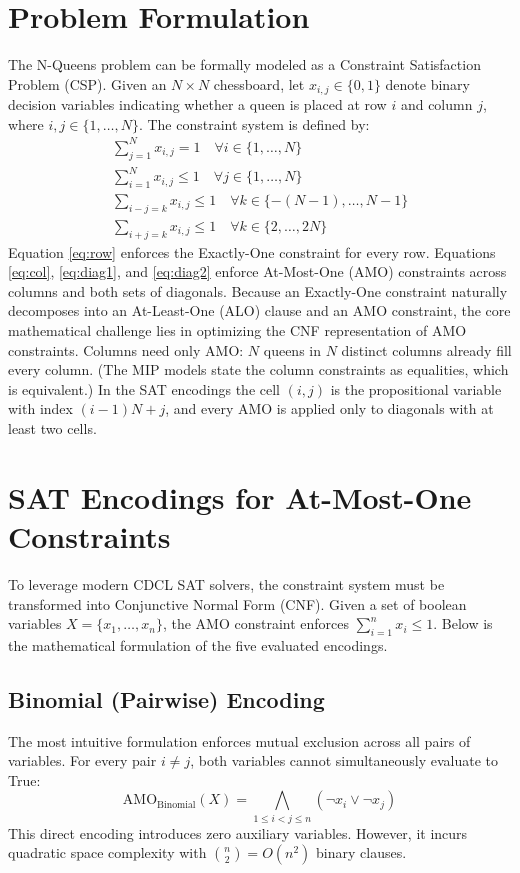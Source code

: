 \documentclass[a4paper,fleqn]{cas-sc}
\begin{document}
\section{Problem Formulation}
The N-Queens problem can be formally modeled as a Constraint Satisfaction Problem (CSP). Given an $N \times N$ chessboard, let $x_{i,j} \in \{0, 1\}$ denote binary decision variables indicating whether a queen is placed at row $i$ and column $j$, where $i, j \in \{1, \dots, N\}$. The constraint system is defined by:
\begin{align}
    \sum_{j=1}^{N} x_{i,j} = 1 \quad \forall i \in \{1, \dots, N\} \label{eq:row} \\
    \sum_{i=1}^{N} x_{i,j} \leq 1 \quad \forall j \in \{1, \dots, N\} \label{eq:col} \\
    \sum_{i-j=k} x_{i,j} \leq 1 \quad \forall k \in \{-(N-1), \dots, N-1\} \label{eq:diag1} \\
    \sum_{i+j=k} x_{i,j} \leq 1 \quad \forall k \in \{2, \dots, 2N\} \label{eq:diag2}
\end{align}
Equation \eqref{eq:row} enforces the Exactly-One constraint for every row. Equations \eqref{eq:col}, \eqref{eq:diag1}, and \eqref{eq:diag2} enforce At-Most-One (AMO) constraints across columns and both sets of diagonals. Because an Exactly-One constraint naturally decomposes into an At-Least-One (ALO) clause and an AMO constraint, the core mathematical challenge lies in optimizing the CNF representation of AMO constraints. Columns need only AMO: $N$ queens in $N$ distinct columns already fill every column. (The MIP models state the column constraints as equalities, which is equivalent.) In the SAT encodings the cell $(i,j)$ is the propositional variable with index $(i-1)N + j$, and every AMO is applied only to diagonals with at least two cells.

\section{SAT Encodings for At-Most-One Constraints}
To leverage modern CDCL SAT solvers, the constraint system must be transformed into Conjunctive Normal Form (CNF). Given a set of boolean variables $X = \{x_1, \dots, x_n\}$, the AMO constraint enforces $\sum_{i=1}^n x_i \leq 1$. Below is the mathematical formulation of the five evaluated encodings.

\subsection{Binomial (Pairwise) Encoding}
The most intuitive formulation enforces mutual exclusion across all pairs of variables. For every pair $i \neq j$, both variables cannot simultaneously evaluate to True:
\begin{equation}
    \mathrm{AMO}_{\text{Binomial}}(X) = \bigwedge_{1 \leq i < j \leq n} (\neg x_i \vee \neg x_j)
\end{equation}
This direct encoding introduces zero auxiliary variables. However, it incurs quadratic space complexity with $\binom{n}{2} = O(n^2)$ binary clauses.
\end{document}
